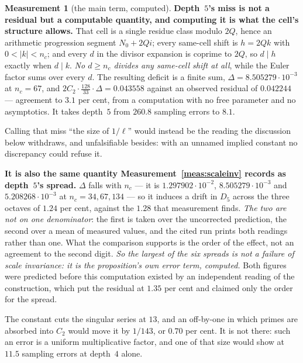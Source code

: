 \documentclass[11pt,a4paper]{article}
\theoremstyle{plain}
\theoremstyle{definition}
\newtheorem{measurement}[theorem]{Measurement}
\theoremstyle{remark}
\begin{document}
\begin{measurement}[the main term, computed]
\textbf{Depth~$5$'s miss is not a residual but a computable quantity,
and computing it is what the cell's structure allows.} That cell is a
single residue class modulo $2Q$, hence an arithmetic progression
segment $N_0+2Qi$; every same-cell shift is $h=2Qk$ with $0<|k|<n_c$;
and every $d$ in the divisor expansion is coprime to $2Q$, so $d\mid h$
exactly when $d\mid k$. \emph{No $d\ge n_c$ divides any same-cell shift
at all}, while the Euler factor sums over every $d$. The resulting
deficit is a finite sum, $\Delta=8.505279\cdot10^{-3}$ at $n_c=67$, and
$2C_2\cdot\tfrac{128}{33}\cdot\Delta=0.043558$ against an observed
residual of $0.042244$ --- agreement to $3.1$ per cent, from a
computation with no free parameter and no asymptotics. It takes
depth~$5$ from $260.8$ sampling errors to $8.1$.

Calling that miss ``the size of $1/\ell$'' would instead be the reading
the discussion below withdraws, and unfalsifiable besides: with an
unnamed implied constant no discrepancy could refuse it.

\textbf{It is also the same quantity Measurement~\ref{meas:scaleinv}
records as depth~$5$'s spread.} $\Delta$ falls with $n_c$ --- it is
$1.297902\cdot10^{-2}$, $8.505279\cdot10^{-3}$ and
$5.208268\cdot10^{-3}$ at $n_c=34,67,134$ --- so it induces a drift in
$D_5$ across the three octaves of $1.24$ per cent, against the $1.28$
that measurement finds. \emph{The two are not on one denominator}: the
first is taken over the uncorrected prediction, the second over a mean
of measured values, and the cited run prints both readings rather than
one. What the comparison supports is the order of the effect, not an
agreement to the second digit. \emph{So the largest of the six spreads is not
a failure of scale invariance: it is the proposition's own error term,
computed.} Both figures were predicted before this computation existed
by an independent reading of the construction, which put the residual
at $1.35$ per cent and claimed only the order for the spread.

The constant cuts the singular series at $13$, and an off-by-one in
which primes are absorbed into $C_2$ would move it by $1/143$, or
$0.70$ per cent. It is not there: such an error is a uniform
multiplicative factor, and one of that size would show at $11.5$
sampling errors at depth~$4$ alone.


\end{measurement}
\end{document}
